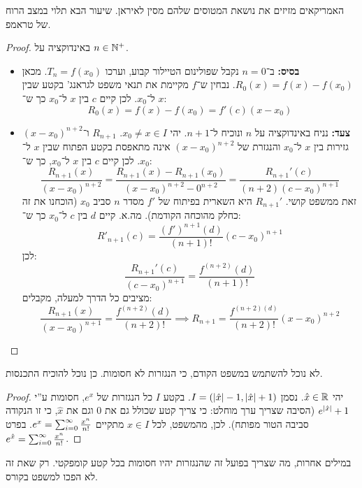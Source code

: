 \documentclass[name=רשימות חשבון דיפרנציאלי ואינטגרלי 1א]{../../../tex/classes/megasumPreamble}
\begin{document}
	האמריקאים מזיזים את נושאת המטוסים שלהם מסין לאיראן. שיעור הבא תלוי במצב הרוח של טראמפ.

	\begin{proof}
		באינדוקציה על $n \in \mathbb{N}^{+}$.
		\begin{itemize}
			\item \textbf{בסיס: }ב־$n = 0$ נקבל שפולינום הטיילור קבוע, וערכו $T_n = f(x_0)$. מכאן $R_0(x) = f(x)- f(x_0)$. נבחין ש־$f$ מקיימת את תנאי משפט לגראנג' בקטע שבין $x$ ל־$x_0$. לכן קיים $c$ בין $x$ ל־$x_0$ כך ש־:
			\[ R_0(x) = f(x) - f(x_0) = f'(c)(x -x_0) \]
			\item \textbf{צעד: }נניח באינדוקציה על $n$ ונוכיח ל־$n + 1$. יהי $x_0 \neq x \in I$. $R_{n + 1}$ ו־$(x - x_0)^{n + 2}$ גזירות בין $x$ ל־$x_0$ והנגזרת של $(x - x_0)^{n + 2}$ אינה מתאפסת בקטע הפתוח שבין $x$ ל־$x_0$. לכן קיים $c$ בין $x$ ל־$x_0$, כך ש־:
			\[ \frac{R_{n + 1}(x)}{(x - x_0)^{n + 2}} = \frac{R_{n + 1}(x) - R_{n + 1}(x_0)}{(x - x_0)^{n + 2} - 0^{n + 2}} = \frac{R_{n + 1}'(c)}{(n + 2)(c - x_0)^{n + 1}} \]
			זאת ממשפט קושי. $R_{n + 1}'$ היא השארית בפיתוח של $f'$ מסדר $n$ סביב $x_0$ (הוכחנו את זה כחלק מהוכחה הקודמת). מה.א. קיים $d$ בין $c$ ל־$x_0$ כך ש־:
			\[ R'_{n + 1}(c) = \frac{(f')^{n + 1}(d)}{(n + 1)!}(c - x_0)^{n + 1} \]
			לכן:
			\[ \frac{R_{n + 1}'(c)}{(c - x_0)^{n +1}} = \frac{f^{(n + 2)}(d)}{(n + 1)!} \]
			מציבים כל הדרך למעלה, מקבלים:
			\[ \frac{R_{n + 1}(x)}{(x - x_0)^{n +1}} = \frac{f^{(n + 2)}(d)}{(n+2)!} \implies R_{n + 1} = \frac{f^{(n + 2)(d)}}{(n + 2)!}(x - x_0)^{n + 2} \]
		\end{itemize}\envendproof
	\end{proof}

	לא נוכל להשתמש במשפט הקודם, כי הנגזרות לא חסומות. כן נוכל להוכיח התכנסות.
	\begin{proof}
		יהי $\hat x \in \mathbb{R}$. נסמן $I = (\left \lvert \hat x \right \rvert - 1, \left \lvert \hat x \right \rvert + 1)$. בקטע $I$ כל הנגזרות של $e^{x}$, חסומות ע''י $e^{\left \lvert \hat x \right \rvert} + 1$ (הסיבה שצריך ערך מוחלט: כי צריך קטע שכולל גם את $0$ וגם את $\hat x$, כי זו הנקודה סביבה הטור מפותח). לכן, מהמשפט, לכל $x \in I$ מתקיים $e^{x} = \sum_{i = 0}^{\infty}\frac{x^{n}}{n!}$. בפרט $e^{\hat x} = \sum_{i = 0}^{\infty}\frac{x^{n}}{n!}$.
	\end{proof}
	במילים אחרות, מה שצריך בפועל זה שהנגזרות יהיו חסומות בכל קטע קומפקטי. רק שאת זה לא הפכו למשפט בקורס.
\end{document}
